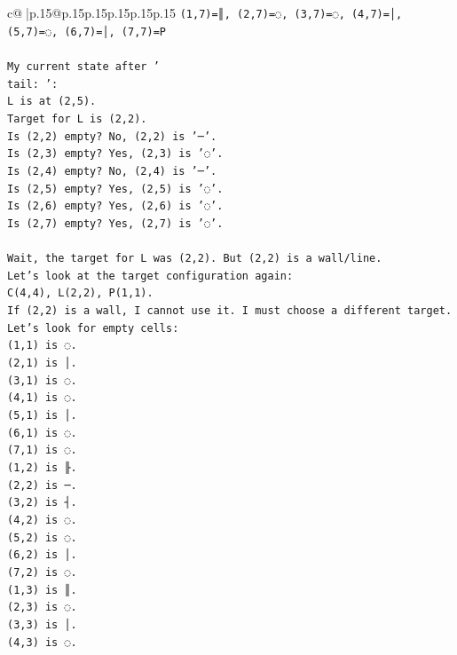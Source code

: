 \documentclass{article}
\begin{document}
{\begin{supertabular}{c@{$\;$}|p{.15\linewidth}@{}p{.15\linewidth}p{.15\linewidth}p{.15\linewidth}p{.15\linewidth}p{.15\linewidth}}
{{{\texttt{(1,7)=║, (2,7)=◌, (3,7)=◌, (4,7)=│, (5,7)=◌, (6,7)=│, (7,7)=P} \\
\\ 
\texttt{My current state after '} \\
\texttt{tail: ':} \\
\texttt{L is at (2,5).} \\
\texttt{Target for L is (2,2).} \\
\texttt{Is (2,2) empty? No, (2,2) is '─'.} \\
\texttt{Is (2,3) empty? Yes, (2,3) is '◌'.} \\
\texttt{Is (2,4) empty? No, (2,4) is '─'.} \\
\texttt{Is (2,5) empty? Yes, (2,5) is '◌'.} \\
\texttt{Is (2,6) empty? Yes, (2,6) is '◌'.} \\
\texttt{Is (2,7) empty? Yes, (2,7) is '◌'.} \\
\\ 
\texttt{Wait, the target for L was (2,2). But (2,2) is a wall/line.} \\
\texttt{Let's look at the target configuration again:} \\
\texttt{C(4,4), L(2,2), P(1,1).} \\
\texttt{If (2,2) is a wall, I cannot use it. I must choose a different target.} \\
\texttt{Let's look for empty cells:} \\
\texttt{(1,1) is ◌.} \\
\texttt{(2,1) is │.} \\
\texttt{(3,1) is ◌.} \\
\texttt{(4,1) is ◌.} \\
\texttt{(5,1) is │.} \\
\texttt{(6,1) is ◌.} \\
\texttt{(7,1) is ◌.} \\
\texttt{(1,2) is ╟.} \\
\texttt{(2,2) is ─.} \\
\texttt{(3,2) is ┤.} \\
\texttt{(4,2) is ◌.} \\
\texttt{(5,2) is ◌.} \\
\texttt{(6,2) is │.} \\
\texttt{(7,2) is ◌.} \\
\texttt{(1,3) is ║.} \\
\texttt{(2,3) is ◌.} \\
\texttt{(3,3) is │.} \\
\texttt{(4,3) is ◌.} \\
}}}
\end{supertabular}}
\end{document}
